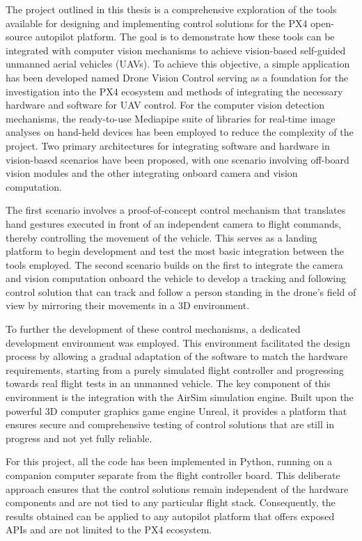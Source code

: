 The project outlined in this thesis is a comprehensive exploration of the tools available for designing and implementing control solutions for the PX4 open-source autopilot platform. The goal is to demonstrate how these tools can be integrated with computer vision mechanisms to achieve vision-based self-guided unmanned aerial vehicles (UAVs).
To achieve this objective, a simple application has been developed named Drone Vision Control serving as a foundation for the investigation into the PX4 ecosystem and methods of integrating the necessary hardware and software for UAV control.
For the computer vision detection mechanisms, the ready-to-use Mediapipe suite of libraries for real-time image analyses on hand-held devices has been employed to reduce the complexity of the project.
Two primary architectures for integrating software and hardware in vision-based scenarios have been proposed, with one scenario involving off-board vision modules and the other integrating onboard camera and vision computation. 

The first scenario involves a proof-of-concept control mechanism that translates hand gestures executed in front of an independent camera to flight commands, thereby controlling the movement of the vehicle. This serves as a landing platform to begin development and test the most basic integration between the tools employed.
The second scenario builds on the first to integrate the camera and vision computation onboard the vehicle to develop a tracking and following control solution that can track and follow a person standing in the drone's field of view by mirroring their movements in a 3D environment.

To further the development of these control mechanisms, a dedicated development environment was employed. This environment facilitated the design process by allowing a gradual adaptation of the software to match the hardware requirements, starting from a purely simulated flight controller and progressing towards real flight tests in an unmanned vehicle.
The key component of this environment is the integration with the AirSim simulation engine. Built upon the powerful 3D computer graphics game engine Unreal, it provides a platform that ensures secure and comprehensive testing of control solutions that are still in progress and not yet fully reliable.

For this project, all the code has been implemented in Python, running on a companion computer separate from the flight controller board. This deliberate approach ensures that the control solutions remain independent of the hardware components and are not tied to any particular flight stack. Consequently, the results obtained can be applied to any autopilot platform that offers exposed APIs and are not limited to the PX4 ecosystem. 

